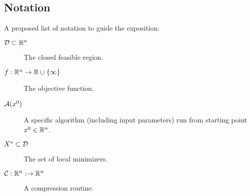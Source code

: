 
\subsection{Notation}
A proposed list of notation to guide the exposition:

\begin{description}
\item[$\mathcal{D}\subset \mathbb{R}^n$] The closed feasible region.
\item[$f:\mathbb{R}^n\rightarrow\mathbb{R}\cup \{\infty\}$] The objective function.
\item[$\mathcal{A}(x^0)$] A specific algorithm (including input parameters) run 
from starting point $x^0 \in \mathbb{R}^n$.
\item[$X^*\subset \mathcal{D}$] The set of local minimizers.
\item[$\mathcal{C}:\mathbb{R}^n: \rightarrow \mathbb{R}^n$] A compression routine.
\end{description}

